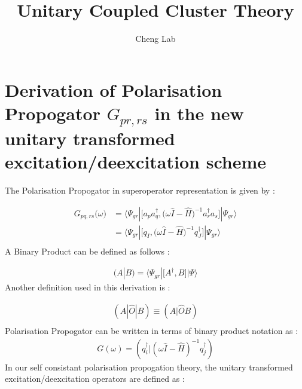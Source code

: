 \documentclass[11pt, oneside]{article}   	%
\title{Unitary Coupled Cluster Theory }
\author{Cheng Lab}
\begin{document}
\maketitle

\section{Derivation of Polarisation Propogator $G_{pr,rs}$ in  the new unitary transformed excitation/deexcitation scheme}
The Polarisation Propogator in superoperator representation is given by :

\begin{equation*}\label{eq:propogator}
  \begin{aligned}
    G_{pq,rs}\big(\omega\big)&=\big \langle \Psi_{gr} |\big[ a_p a_q^\dagger , \big(\omega \hat I-\hat H \big)^{-1} a_r^\dagger a_s \big] | \Psi_{gr}\big \rangle \\
   & =\big \langle \Psi_{gr} |\big[ q_I , \big(\omega \hat I-\hat H \big)^{-1} q_J^\dagger \big] | \Psi_{gr}\big \rangle \\ 
  \end{aligned}
\end{equation*}
A Binary Product can be defined as follows :

\begin{equation*}\label{eq:binary product}
  \begin{aligned}
    (A|B)=\big \langle \Psi_{gr}|\big[A^\dagger,B]|\Psi\rangle
  \end{aligned}
\end{equation*}
Another definition used in this derivation is :

\begin{equation*}\label{eq:superoperator}
  \begin{aligned}
    (A|\hat O |B)\equiv (A|\hat O B)\\
  \end{aligned}
\end{equation*}
Polarisation Propogator can be written in terms of binary product notation as :
\begin{equation*}\label{eq:superoperator}
  \begin{aligned}
    G(\omega)=(q_i^\dagger|(\omega \hat I - \hat H)^{-1}q_j^\dagger )
  \end{aligned}
\end{equation*}
In our self consistant polarisation propogation theory, the unitary transformed excitation/deexcitation operators are defined as :
\end{document}
